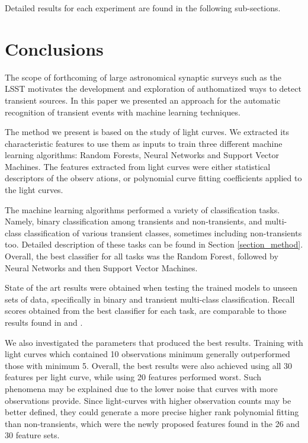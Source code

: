 \documentclass[a4paper,fleqn,usenatbib]{mnras}
\begin{document}
Detailed results for each experiment are found in the following sub-sections.


\section{Conclusions}

The scope of forthcoming of large astronomical synaptic surveys such
as the LSST \citep{0805.2366} motivates the development and
exploration of authomatized ways to detect transient sources.
In this paper we presented an approach for the automatic recognition
of transient events with machine learning techniques.   

The method we present is based on the study of light curves. 
We extracted its characteristic features to use them as inputs
to train three different machine learning algorithms: Random Forests,
Neural Networks and Support Vector Machines.
The features extracted from light curves were either statistical
descriptors of the observ ations, or polynomial curve fitting
coefficients applied to the light curves.   

The machine learning algorithms performed a variety of classification tasks.
Namely, binary classification among transients and non-transients, and
multi-class classification of various transient classes, sometimes
including non-transients too. Detailed description of these tasks can
be found in Section \ref{section_method}.  
Overall, the best classifier for all tasks was the Random Forest,
followed by Neural Networks and then Support Vector Machines. 

State of the art results were obtained when testing the trained models
to unseen sets of data, specifically in binary and transient
multi-class classification. 
Recall scores obtained from the best classifier for each task, are
comparable to those results found in \cite{1401.3211}
and \cite{1601.03931}.   


We also investigated the parameters that produced the best results.
Training with light curves which contained 10 observations minimum
generally outperformed those with minimum 5. 
Overall, the best results were also achieved using all 30 features per
light curve, while using 20 features performed worst. 
Such phenomena may be explained due to the lower noise that curves
with more observations provide.  
Since light-curves with higher observation counts may be better
defined, they could generate a more precise higher rank polynomial
fitting than non-transients, which were the newly proposed features
found in the 26 and 30 feature sets. 
\end{document}
